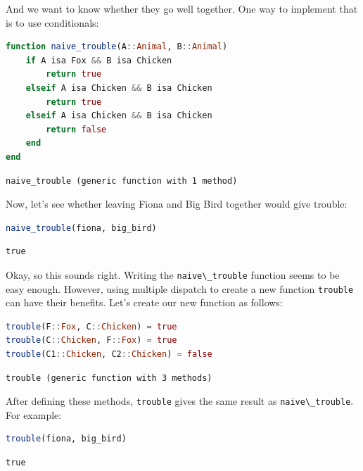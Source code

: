 \documentclass[
  notoc %
]{tufte-book}
\newcommand{\passthrough}[1]{#1}
\begin{document}
And we want to know whether they go well together. One way to implement
that is to use conditionals:

\begin{lstlisting}[language=Julia]
function naive_trouble(A::Animal, B::Animal)
    if A isa Fox && B isa Chicken
        return true
    elseif A isa Chicken && B isa Chicken
        return true
    elseif A isa Chicken && B isa Chicken
        return false
    end
end
\end{lstlisting}

\begin{lstlisting}[language=Output]
naive_trouble (generic function with 1 method)
\end{lstlisting}

Now, let's see whether leaving Fiona and Big Bird together would give
trouble:

\begin{lstlisting}[language=Julia]
naive_trouble(fiona, big_bird)
\end{lstlisting}

\begin{lstlisting}[language=Output]
true
\end{lstlisting}

Okay, so this sounds right. Writing the
\passthrough{\lstinline!naive\_trouble!} function seems to be easy
enough. However, using multiple dispatch to create a new function
\passthrough{\lstinline!trouble!} can have their benefits. Let's create
our new function as follows:

\begin{lstlisting}[language=Julia]
trouble(F::Fox, C::Chicken) = true
trouble(C::Chicken, F::Fox) = true
trouble(C1::Chicken, C2::Chicken) = false
\end{lstlisting}

\begin{lstlisting}[language=Output]
trouble (generic function with 3 methods)
\end{lstlisting}

After defining these methods, \passthrough{\lstinline!trouble!} gives
the same result as \passthrough{\lstinline!naive\_trouble!}. For
example:

\begin{lstlisting}[language=Julia]
trouble(fiona, big_bird)
\end{lstlisting}

\begin{lstlisting}[language=Output]
true
\end{lstlisting}
\end{document}

